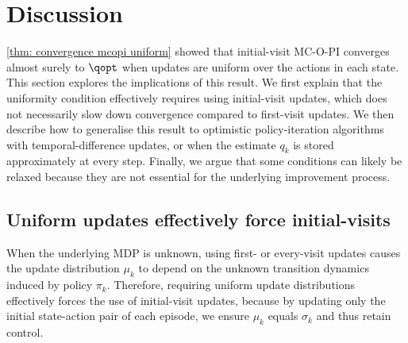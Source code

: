 \section{Discussion}
\label{sec: discussion}

\autoref{thm: convergence mcopi uniform} showed that initial-visit MC-O-PI converges almost surely to $\qopt$ 
when updates are uniform over the actions in each state.
% 
% 
This section explores the implications of this result.
We first explain that the uniformity condition effectively requires using initial-visit updates, which does not necessarily slow down convergence compared to first-visit updates.
We then describe how to generalise this result to optimistic policy-iteration algorithms with temporal-difference updates, or when the estimate $q_k$ is stored approximately at every step.
Finally, we argue that some conditions can likely be relaxed because they are not essential for the underlying improvement process.




\subsection{Uniform updates effectively force initial-visits}


When the underlying MDP is unknown, using first- or every-visit updates causes the update distribution $\mu_k$ to depend on the unknown transition dynamics induced by policy $\pi_k$.
Therefore, requiring uniform update distributions effectively forces the use of initial-visit updates,
because by updating only the initial state-action pair of each episode, we ensure $\mu_k$ equals $\sigma_k$ and thus retain control.

